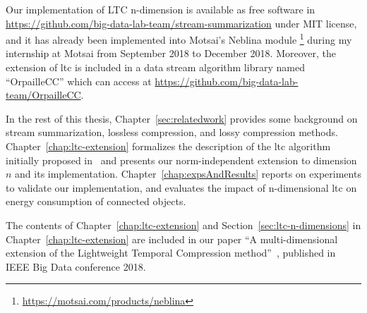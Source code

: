 Our implementation of LTC n-dimension is available as free software in
\url{https://github.com/big-data-lab-team/stream-summarization} under MIT
license, and it has already been implemented into Motsai's Neblina module
\footnote{\url{https://motsai.com/products/neblina}} during my internship at
Motsai from September 2018 to December 2018.  Moreover, the extension of
\acrshort{ltc} is included in a data stream algorithm library named
``OrpailleCC'' which can access at
\url{https://github.com/big-data-lab-team/OrpailleCC}.



In the rest of this thesis, Chapter~\ref{sec:relatedwork} provides some
background on stream summarization, lossless compression, and lossy compression
methods. Chapter~\ref{chap:ltc-extension} formalizes the description of the
\acrshort{ltc} algorithm initially proposed
in~\cite{schoellhammer2004lightweight} and presents our norm-independent
extension to dimension $n$ and its implementation.
Chapter~\ref{chap:expsAndResults} reports on experiments to validate our
implementation, and evaluates the impact of n-dimensional \acrshort{ltc} on
energy consumption of connected objects.

The contents of Chapter~\ref{chap:ltc-extension} and
Section~\ref{sec:ltc-n-dimensions} in Chapter~\ref{chap:ltc-extension} are
included in our paper ``A multi-dimensional extension of the Lightweight
Temporal Compression method''~\cite{li2018multi}, published in IEEE Big Data
conference 2018.



